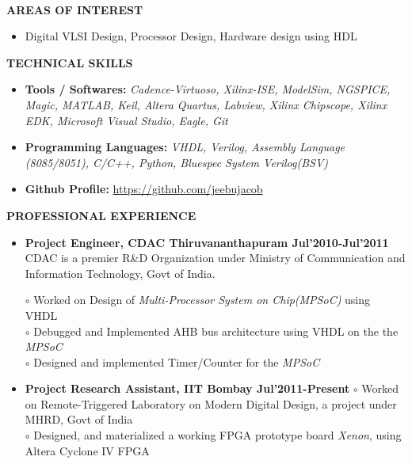 \documentclass[a4paper,10pt]{article}
\begin{document}
\paragraph{}
\textbf{ }
\vspace{2.1in}


\colorbox{titleColor}{\parbox{6.5in}{\textbf{AREAS OF INTEREST}}}
 \begin{itemize}
  \setlength{\itemsep}{1pt}
  \item {{  Digital VLSI Design, Processor Design, Hardware design using HDL}}
 \end{itemize}

 \colorbox{titleColor}{\parbox{6.5in}{\textbf{TECHNICAL SKILLS}}}

 \begin{itemize}
  \setlength{\itemsep}{1pt}
  \item \textbf{{Tools / Softwares:}} \textit{Cadence-Virtuoso, Xilinx-ISE, ModelSim, NGSPICE, Magic, MATLAB, Keil, Altera Quartus, Labview, Xilinx Chipscope, Xilinx EDK, Microsoft Visual Studio, Eagle, Git}
  \item \textbf{{Programming Languages:}} \textit{VHDL, Verilog, Assembly Language (8085/8051), C/C++, Python, Bluespec System Verilog(BSV)}
  \item \textbf{{Github Profile:}} \url{https://github.com/jeebujacob}
 \end{itemize}
 
 
 
  \colorbox{titleColor}{\parbox{6.5in}{\textbf{PROFESSIONAL EXPERIENCE}}}
   \begin{itemize}
    \item \textbf{Project Engineer, CDAC Thiruvananthapuram \qquad\qquad\qquad\quad\qquad\qquad Jul'2010-Jul'2011\\}
    CDAC is a premier R\&D Organization under Ministry of Communication and Information Technology, Govt of India.

    $\circ$  Worked on  Design of \textit{Multi-Processor System on Chip(MPSoC)} using VHDL \\
    $\circ$  Debugged and Implemented AHB bus architecture using VHDL on the the \textit{MPSoC}\\
    $\circ$  Designed and implemented Timer/Counter for the \textit{MPSoC}
    \item \textbf{Project Research Assistant, IIT Bombay 	\qquad\qquad\qquad\qquad\quad\qquad\qquad\qquad Jul'2011-Present}
     $\circ$ Worked on Remote-Triggered Laboratory on Modern Digital Design, a project under MHRD, Govt of India\\
    $\circ$ Designed, and materialized a working FPGA prototype board \textit{Xenon}, using Altera Cyclone IV FPGA  
    
 \end{itemize}
 
\end{document}

